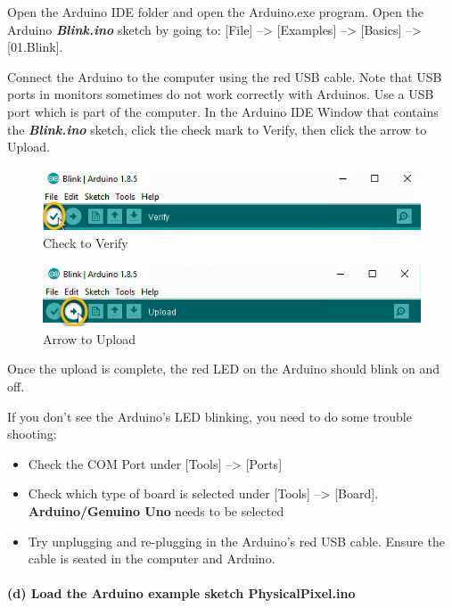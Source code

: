 \documentclass[11pt]{article}
\begin{document}
Open the Arduino IDE folder and open the Arduino.exe program. Open the
Arduino \textbf{\emph{Blink.ino}} sketch by going to: {[}File{]}
--\textgreater{} {[}Examples{]} --\textgreater{} {[}Basics{]}
--\textgreater{} {[}01.Blink{]}.

Connect the Arduino to the computer using the red USB cable. Note that
USB ports in monitors sometimes do not work correctly with Arduinos. Use
a USB port which is part of the computer. In the Arduino IDE Window that
contains the \textbf{\emph{Blink.ino}} sketch, click the check mark to
Verify, then click the arrow to Upload.

\begin{figure}
\centering
\includegraphics{images/Check_to_Verify.png}
\caption{Check to Verify}
\end{figure}

\begin{figure}
\centering
\includegraphics{images/Arrow_to_Upload.png}
\caption{Arrow to Upload}
\end{figure}

Once the upload is complete, the red LED on the Arduino should blink on
and off.

If you don't see the Arduino's LED blinking, you need to do some trouble
shooting:

\begin{itemize}
\tightlist
\item
  Check the COM Port under {[}Tools{]} --\textgreater{} {[}Ports{]}
\item
  Check which type of board is selected under {[}Tools{]}
  --\textgreater{} {[}Board{]}. \textbf{Arduino/Genuino Uno} needs to be
  selected
\item
  Try unplugging and re-plugging in the Arduino's red USB cable. Ensure
  the cable is seated in the computer and Arduino.
\end{itemize}

    \hypertarget{d-load-the-arduino-example-sketch-physicalpixel.ino}{%
\paragraph{(d) Load the Arduino example sketch
PhysicalPixel.ino}\label{d-load-the-arduino-example-sketch-physicalpixel.ino}}
\end{document}
